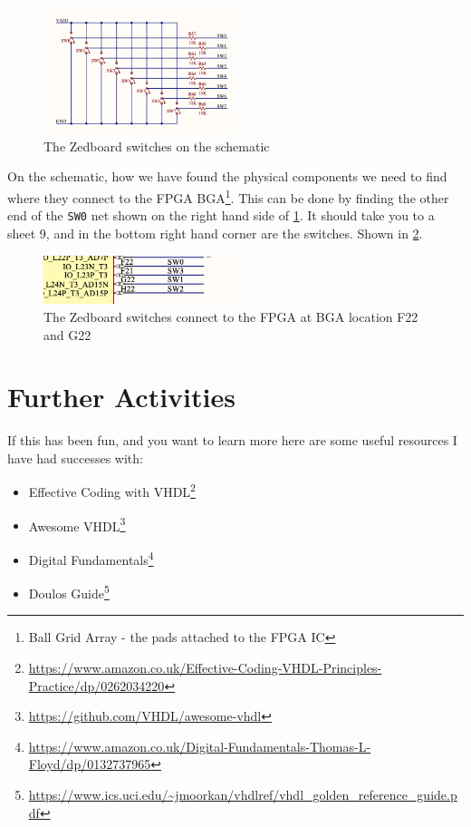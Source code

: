 \begin{figure}[H]
    \begin{center}
        \includegraphics[width=0.5\textwidth]{./src/schem_sw.png}
        \caption{The Zedboard switches  on the schematic}
        \label{fig:schemsw}
    \end{center}
\end{figure}

On the schematic, how we have found the physical components we need to find where they connect to the FPGA BGA\footnote{Ball Grid Array - the pads attached to the FPGA IC}. This can be done by finding the other end of the \texttt{SW0} net shown on the right hand side of \cref{fig:schemsw}. It should take you to a sheet 9, and in the bottom right hand corner are the switches. Shown in \cref{fig:schembga}.



\begin{figure}[H]
    \begin{center}
        \includegraphics[width=0.5\textwidth]{./src/schem_bga.png}
        \caption{The Zedboard switches connect to the FPGA at BGA location F22 and G22}
        \label{fig:schembga}
    \end{center}
\end{figure}

\section{Further Activities}\label{section:fa}
If this has been fun, and you want to learn more here are some useful resources I have had successes with:

\begin{itemize}
    \item Effective Coding with VHDL\footnote{\url{https://www.amazon.co.uk/Effective-Coding-VHDL-Principles-Practice/dp/0262034220}} 
    \item Awesome VHDL\footnote{\url{https://github.com/VHDL/awesome-vhdl}}
    \item Digital Fundamentals\footnote{\url{https://www.amazon.co.uk/Digital-Fundamentals-Thomas-L-Floyd/dp/0132737965}}
    \item Doulos Guide\footnote{\url{https://www.ics.uci.edu/~jmoorkan/vhdlref/vhdl_golden_reference_guide.pdf}}
\end{itemize}
